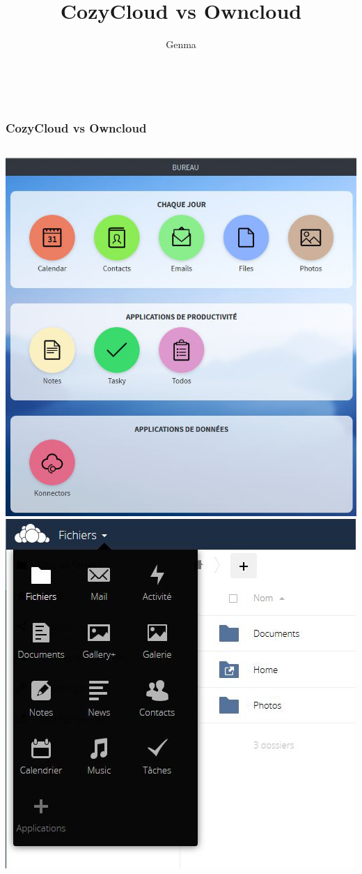 \documentclass{beamer}
\title[CozyCloud vs Owncloud]{CozyCloud vs Owncloud}
\author{Genma}
\begin{document}
\begin{frame}
	\titlepage
	\vfill
	\begin{center}
		\\[2.5ex]
		{\tiny\CcNote{\CcLongnameByNcSa}}
		\vspace*{-2.5ex}
	\end{center}
\end{frame}

\begin{frame}
\frametitle{CozyCloud vs Owncloud}
\begin{columns}[c] 
\includegraphics[scale=0.25] {./CozyCloud/CozyCloud_Bureau.jpg}
\includegraphics[scale=0.38] {./Owncloud/OwnCloud_Liste_applications.jpg}
\end{columns}
\end{frame}
\end{document}
